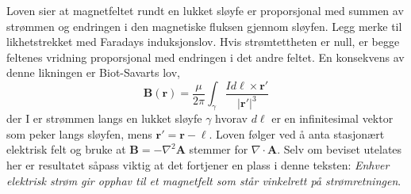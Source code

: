 \documentclass[twoside,utf8]{article}
\begin{document}
  Loven sier at magnetfeltet rundt en lukket sløyfe er proporsjonal med summen av strømmen og endringen i den magnetiske fluksen gjennom sløyfen. Legg merke til likhetstrekket med Faradays induksjonslov. Hvis strømtettheten er null, er begge feltenes vridning proporsjonal med endringen i det andre feltet. En konsekvens av denne likningen er Biot-Savarts lov,
  $$
  \mathbf{B}(\mathbf{r}) = \frac{\mu}{2\pi}\int_\gamma \frac{I d\mathbf{\ell} \times \mathbf{r}'}{|\mathbf{r}'|^3}
  $$
  der I er strømmen langs en lukket sløyfe $\gamma$ hvorav $d\mathbf{\ell}$ er en infinitesimal vektor som peker langs sløyfen, mens $\mathbf{r}'=\mathbf{r}-\mathbf{\ell}$. Loven følger ved å anta stasjonært elektrisk felt og bruke at $\mathbf{B}=-\nabla^2 \mathbf{A}$ stemmer for $\nabla \cdot \mathbf{A}$. Selv om beviset utelates her er resultatet såpass viktig at det fortjener en plass i denne teksten: {\it Enhver elektrisk strøm gir opphav til et magnetfelt som står vinkelrett på strømretningen}.
\end{document}
